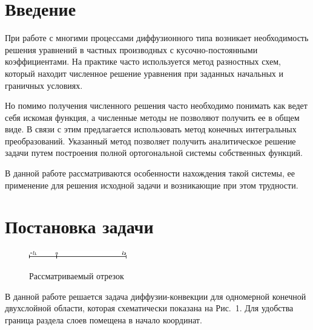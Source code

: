 \documentclass[12pt, a4paper]{article}
\begin{document}
\newpage
\section{Введение}
При работе с многими процессами диффузионного типа возникает необходимость решения уравнений
в частных производных с кусочно-постоянными коэффициентами.
На практике часто используется метод разностных схем, который находит численное решение уравнения при
заданных начальных и граничных условиях.

Но помимо получения численного решения часто необходимо понимать как ведет себя искомая функция, а численные методы не позволяют получить ее в общем виде.
В связи с этим предлагается использовать метод конечных интегральных преобразований.
Указанный метод позволяет получить аналитическое решение задачи путем построения полной ортогональной
системы собственных функций.

В данной работе рассматриваются особенности нахождения такой системы, ее применение для решения исходной задачи
и возникающие при этом трудности.

\section{Постановка задачи}
\begin{figure}
  \centering
  \label{fig1}
  \includegraphics[width=0.38\textwidth]{fig1.eps}
  \\
  \caption{Рассматриваемый отрезок}
\end{figure}
В данной работе решается задача диффузии-конвекции для одномерной конечной двухслойной области, которая схематически показана на Рис.~1. Для удобства граница раздела слоев помещена в начало координат.
\end{document}
